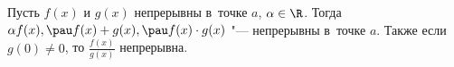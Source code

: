 
Пусть $f(x)$ и $g(x)$ непрерывны в~точке $a$, $\alpha\in\R$. Тогда
$\alpha f(x),\pau f(x)+g(x),\pau f(x)\cdot g(x)$ "--- непрерывны в~точке
$a$. Также если $g(0)\neq 0$, то $\frac{f(x)}{g(x)}$ непрерывна.
